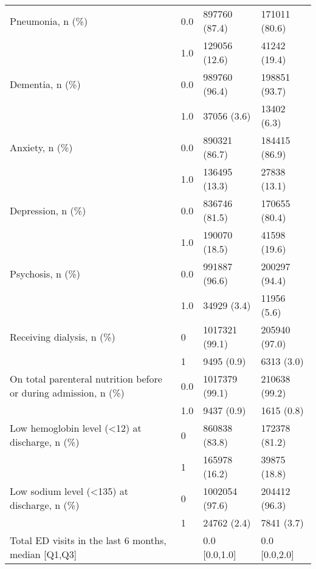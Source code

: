 \begin{tabular}{llll}
Pneumonia, n (\%) & 0.0 &                         897760 (87.4) &     171011 (80.6) \\
                                       & 1.0 &                         129056 (12.6) &      41242 (19.4) \\
Dementia, n (\%) & 0.0 &                         989760 (96.4) &     198851 (93.7) \\
                                       & 1.0 &                           37056 (3.6) &       13402 (6.3) \\
Anxiety, n (\%) & 0.0 &                         890321 (86.7) &     184415 (86.9) \\
                                       & 1.0 &                         136495 (13.3) &      27838 (13.1) \\
Depression, n (\%) & 0.0 &                         836746 (81.5) &     170655 (80.4) \\
                                       & 1.0 &                         190070 (18.5) &      41598 (19.6) \\
Psychosis, n (\%) & 0.0 &                         991887 (96.6) &     200297 (94.4) \\
                                       & 1.0 &                           34929 (3.4) &       11956 (5.6) \\
Receiving dialysis, n (\%) & 0 &                        1017321 (99.1) &     205940 (97.0) \\
                                       & 1 &                            9495 (0.9) &        6313 (3.0) \\
On total parenteral nutrition before or during admission, n (\%) & 0.0 &                        1017379 (99.1) &     210638 (99.2) \\
                                       & 1.0 &                            9437 (0.9) &        1615 (0.8) \\
Low hemoglobin level (<12) at discharge, n (\%) & 0 &                         860838 (83.8) &     172378 (81.2) \\
                                       & 1 &                         165978 (16.2) &      39875 (18.8) \\
Low sodium level (<135) at discharge, n (\%) & 0 &                        1002054 (97.6) &     204412 (96.3) \\
                                       & 1 &                           24762 (2.4) &        7841 (3.7) \\
Total ED visits in the last 6 months, median [Q1,Q3] &   &                         0.0 [0.0,1.0] &     0.0 [0.0,2.0] \\

\end{tabular}

